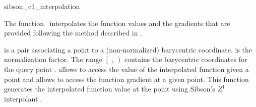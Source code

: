 
\begin{ccRefFunction}{sibson_c1_interpolation}  %

\ccDefinition
  
The function \ccRefName\ interpolates the function values and the
gradients that are provided following the method described in \cite{s-bdnni-81}.



 {
   is a pair associating a point to a
  (non-normalized) barycentric coordinate.  is the
  normalization factor. The range $\left[\right.$ ,
  $\left.\right)$ contains the barycentric coordinates for
  the query point .  allows to access the value of the
  interpolated function given a point and  allows to
  access the function gradient at a given point. This function
  generates the interpolated function value at the point  using
  Sibson's $Z^1$ interpolant \cite{s-bdnni-81}.}


\end{ccRefFunction}
